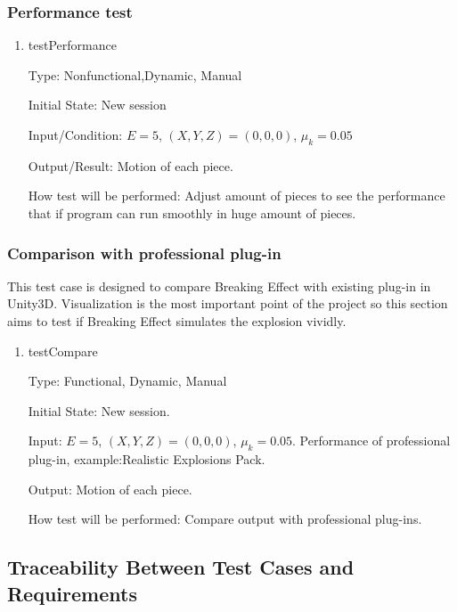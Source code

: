 \documentclass[12pt, titlepage]{article}
\begin{document}
\subsubsection{Performance test}

\begin{enumerate}

\item{testPerformance\\}

Type: Nonfunctional,Dynamic, Manual
					
Initial State: New session
					
Input/Condition: $E = 5$, $(X,Y,Z) = (0,0,0)$, $\mu_{k} = 0.05$
					
Output/Result: Motion of each piece.
					
How test will be performed: Adjust amount of pieces to see the performance that if program can run smoothly in huge amount of pieces.

\end{enumerate}

\subsubsection{Comparison with professional plug-in}

This test case is designed to compare Breaking Effect with existing plug-in in Unity3D. Visualization is the most important point of the project so this section aims to test if Breaking Effect simulates the explosion vividly. 

\begin{enumerate}
	
	\item{testCompare\\}
	
	Type: Functional, Dynamic, Manual
	
	Initial State: New session.
	
	Input: $E = 5$, $(X,Y,Z) = (0,0,0)$, $\mu_{k} = 0.05$. Performance of professional plug-in, example:Realistic Explosions Pack.
	
	Output: Motion of each piece.
	
	How test will be performed: Compare output with professional plug-ins. 
	
\end{enumerate}

\subsection{Traceability Between Test Cases and Requirements}
\end{document}

